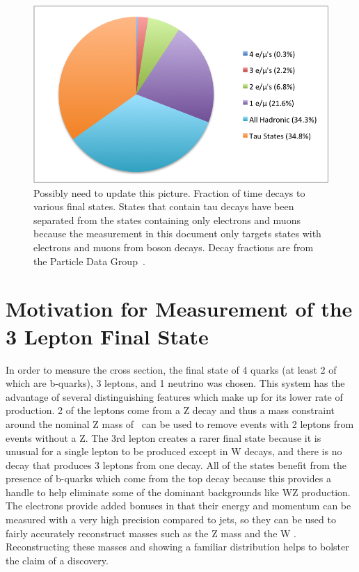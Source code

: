 	\begin{figure}[h]
\begin{center}
\includegraphics[width=0.8\linewidth]{Figs/ttZ_decay_fraction.png}
\caption{\label{fig:ttZ_decay_rates}
Possibly need to update this picture. Fraction of time \ttZ decays to various final states. States that contain tau decays have been separated from the states containing only electrons and muons because the measurement in this document only targets states with electrons and muons from boson decays. Decay fractions are from the Particle Data Group~\cite{pdg}.
}
\end{center}
\end{figure} 

	
	\section{Motivation for Measurement of the 3 Lepton Final State}
	In order to measure the \ttZ cross section, the final state of 4 quarks (at least 2 of which are b-quarks), 3 leptons, and 1 neutrino was chosen. This system has the advantage of several distinguishing features which make up for its lower rate of production. 2 of the leptons come from a Z decay and thus a mass constraint around the nominal Z mass of \zmass \ can be used to remove events with 2 leptons from events without a Z. The 3rd lepton creates a rarer final state because it is unusual for a single lepton to be produced except in W decays, and there is no decay that produces 3 leptons from one decay. All of the states benefit from the presence of b-quarks which come from the top decay because this provides a handle to help eliminate some of the dominant backgrounds like WZ production.\\
	
	The electrons provide added bonuses in that their energy and momentum can be measured with a very high precision compared to jets, so they can be used to fairly accurately reconstruct masses such as the Z mass and the W \mt. Reconstructing these masses and showing a familiar distribution helps to bolster the claim of a \ttZ discovery. 